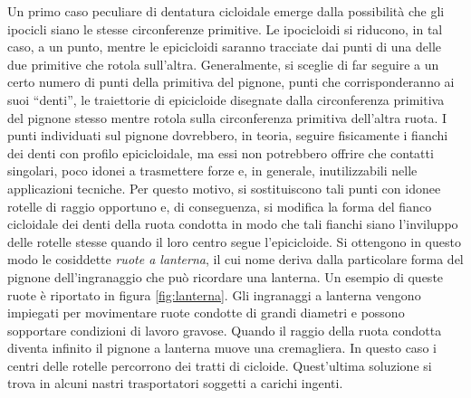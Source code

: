 \noindent Un primo caso peculiare di dentatura cicloidale
emerge dalla possibilit\`a che gli ipocicli siano
le stesse circonferenze primitive. Le ipocicloidi si riducono, in tal caso,
a un punto, mentre le epicicloidi saranno tracciate dai punti di una
delle due primitive che rotola sull'altra.
Generalmente, si sceglie di far seguire a un certo numero di punti della
primitiva del pignone, punti che corrisponderanno ai suoi ``denti'',
le traiettorie di epicicloide disegnate dalla circonferenza
primitiva del  pignone stesso mentre rotola
sulla circonferenza primitiva dell'altra ruota.
I punti individuati sul pignone dovrebbero, in teoria,
 seguire fisicamente i fianchi dei 
denti con profilo epicicloidale, ma essi non potrebbero
offrire che contatti singolari,
poco idonei a trasmettere forze e, in generale, inutilizzabili nelle
applicazioni tecniche. Per questo motivo, si sostituiscono
tali punti con idonee rotelle di raggio  opportuno
e, di conseguenza,  si modifica la forma del fianco cicloidale dei
denti della ruota
condotta in modo che tali fianchi siano l'inviluppo delle
rotelle stesse quando il loro centro segue l'epicicloide.
Si ottengono in questo modo
le cosiddette 
{\em ruote a lanterna}, il cui nome deriva 
dalla particolare forma del pignone dell'ingranaggio che pu\`o ricordare
una lanterna. Un esempio di queste ruote \`e riportato in figura \ref{fig:lanterna}.
Gli ingranaggi a lanterna vengono impiegati per movimentare ruote
 condotte
di grandi diametri e possono sopportare condizioni di lavoro gravose.
Quando il raggio
della ruota condotta diventa infinito il pignone a lanterna muove
una cremagliera. In questo caso i centri delle rotelle percorrono
dei tratti di cicloide. Quest'ultima soluzione si trova in alcuni
nastri trasportatori soggetti a carichi ingenti.
